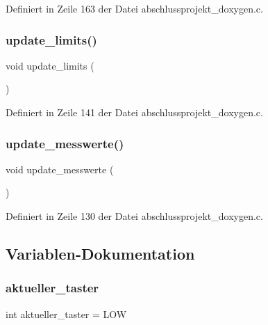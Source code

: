 Definiert in Zeile 163 der Datei abschlussprojekt\+\_\+doxygen.\+c.

\mbox{\label{abschlussprojekt__doxygen_8c_a1efb14d12b812e3a0f08188dbaeccc5e}} 
\subsubsection{update\+\_\+limits()}
{\footnotesize\ttfamily void update\+\_\+limits (\begin{DoxyParamCaption}{ }\end{DoxyParamCaption})}



Definiert in Zeile 141 der Datei abschlussprojekt\+\_\+doxygen.\+c.

\mbox{\label{abschlussprojekt__doxygen_8c_a992b1037e3565070916e60498c1a62ff}} 
\subsubsection{update\+\_\+messwerte()}
{\footnotesize\ttfamily void update\+\_\+messwerte (\begin{DoxyParamCaption}{ }\end{DoxyParamCaption})}



Definiert in Zeile 130 der Datei abschlussprojekt\+\_\+doxygen.\+c.



\subsection{Variablen-\/\+Dokumentation}
\mbox{\label{abschlussprojekt__doxygen_8c_aec00a17d0e71d1e7f6478babd75d6319}} 
\subsubsection{aktueller\+\_\+taster}
{\footnotesize\ttfamily int aktueller\+\_\+taster = L\+OW}



